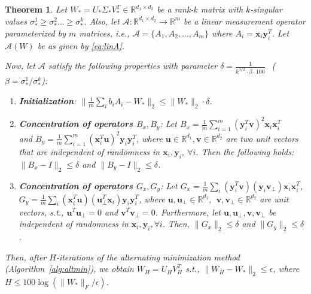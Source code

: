 \documentclass[11pt]{article}
\newtheorem{theorem}[lemma]{Theorem}
\newcommand{\R}{\mathbb{R}}
\newcommand{\tp}[1]{{#1}^{T}}
\renewcommand{\u}{\bm{u}}
\renewcommand{\v}{\bm{v}}
\newcommand{\Vot}{\tp{V}_*}
\newcommand{\So}{\Sigma_*}
\newcommand{\Uo}{U_*}
\newcommand{\so}{\sigma_*}
\newcommand{\Wo}{W_*}
\newcommand{\x}{\bm{x}}
\newcommand{\y}{\bm{y}}
\begin{document}
\begin{theorem}\label{thm:general}
Let $\Wo =\Uo\So\Vot\in \mathbb{R}^{d_1\times d_2}$ be a rank-$k$ matrix with $k$-singular values $\so^1\geq \so^2\dots\geq \so^k$. %
Also, let $\mathcal{A}: \R^{d_1\times d_2}\rightarrow \R^m$ be a linear measurement operator parameterized by $m$ matrices, i.e., $\mathcal{A}=\{A_1, A_2, \dots, A_m\}$ where $A_i=\x_i\y_i^T$. Let $\mathcal{A}(W)$ be as given by \eqref{eq:linA}. %

Now, let $\mathcal{A}$ satisfy the following properties with parameter $\delta=\frac{1}{k^{3/2} \cdot \beta \cdot 100}\ \ $ ($\beta=\so^1/\so^k$): %
  \begin{enumerate}
  \item {\bf Initialization}: $\|\frac{1}{m}\sum_i b_i A_i-\Wo\|_2\leq \|\Wo\|_2\cdot \delta$. 
  \item {\bf Concentration of operators $B_x, B_y$}: Let $B_x=\frac{1}{m}\sum_{i=1}^m (\y_i^T\v)^2\x_i\tp{\x}_i$\\ and $B_y=\frac{1}{m}\sum_{i=1}^m (\tp{\x}_i\u)^2\y_i\tp{\y}_i$, where  $\u\in \mathbb{R}^{d_1}, \v\in \mathbb{R}^{d_2}$ are two unit vectors that are {\em independent} of randomness in $\x_i, \y_i,\ \forall i$. %
Then the following holds: $\|B_x-I\|_2\leq \delta$ and  $\|B_y-I\|_2\leq \delta$.
\item {\bf Concentration of operators $G_x, G_y$}: Let $G_x=\frac{1}{m}\sum_i (\y_i^T\v)(\y_i\v_\perp)\x_i\tp{\x}_i$,\\ $G_y=\frac{1}{m}\sum_i (\tp{\x}_i\u)(\tp{\u}_\perp\x_i)\y_i\tp{\y}_i$, where $\u,\u_\perp\in \mathbb{R}^{d_1},\ \  \v,\v_\perp\in \mathbb{R}^{d_2}$ are unit vectors, s.t., $\tp{\u}\u_\perp=0$ and $\tp{\v}\v_\perp=0$. Furthermore, let $\u, \u_\perp, \v, \v_\perp$ be independent of randomness in $\x_i, \y_i, \forall i$. 
Then, $\|G_x\|_2\leq \delta$ and $\|G_y\|_2\leq \delta$. 
  \end{enumerate}
Then, after $H$-iterations of the alternating minimization method (Algorithm~\ref{alg:altmin}), we obtain $W_H=U_H\tp{V}_H$ s.t., $\|W_H-\Wo\|_2\leq \epsilon$, where $H\leq 100\log(\|\Wo\|_F/\epsilon)$. 
\end{theorem}
\end{document}
